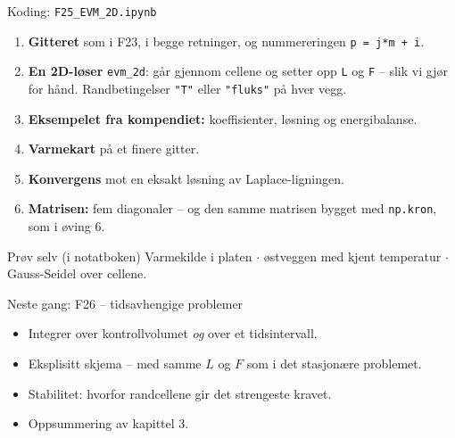 \documentclass[11pt,aspectratio=169]{beamer}
\begin{document}
\begin{frame}{Koding: \texttt{F25\_EVM\_2D.ipynb}}
\begin{enumerate}
\item \textbf{Gitteret} som i F23, i begge retninger, og nummereringen \texttt{p = j*m + i}.
\item \textbf{En 2D-løser} \texttt{evm\_2d}: går gjennom cellene og setter opp \texttt{L} og \texttt{F} -- slik vi gjør for hånd. Randbetingelser \texttt{"T"} eller \texttt{"fluks"} på hver vegg.
\item \textbf{Eksempelet fra kompendiet:} koeffisienter, løsning og energibalanse.
\item \textbf{Varmekart} på et finere gitter.
\item \textbf{Konvergens} mot en eksakt løsning av Laplace-ligningen.
\item \textbf{Matrisen:} fem diagonaler -- og den samme matrisen bygget med \texttt{np.kron}, som i øving 6.
\end{enumerate}
\begin{remb}{Prøv selv (i notatboken)}
Varmekilde i platen \;$\cdot$\; østveggen med kjent temperatur \;$\cdot$\; Gauss-Seidel over cellene.
\end{remb}
\end{frame}

\begin{frame}{Neste gang: F26 -- tidsavhengige problemer}
\begin{nestefb}
\begin{itemize}
\item Integrer over kontrollvolumet \emph{og} over et tidsintervall.
\item Eksplisitt skjema -- med samme $L$ og $F$ som i det stasjonære problemet.
\item Stabilitet: hvorfor randcellene gir det strengeste kravet.
\item Oppsummering av kapittel 3.
\end{itemize}
\end{nestefb}
\end{frame}
\end{document}
